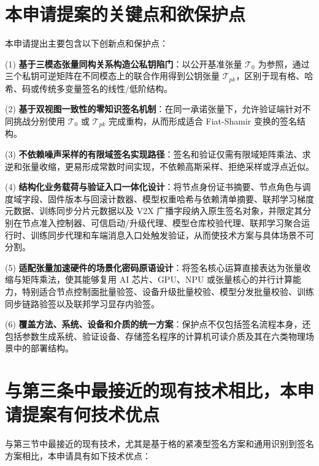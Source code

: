 \documentclass[12pt,a4paper]{article}
\begin{document}
\section{本申请提案的关键点和欲保护点}

本申请提出主要包含以下创新点和保护点：

(1) \textbf{基于三模态张量同构关系构造公私钥陷门}：以公开基准张量 $\mathcal{T}_0$ 为参照，通过三个私钥可逆矩阵在不同模态上的联合作用得到公钥张量 $\mathcal{T}_{pk}$，区别于现有格、哈希、码或传统多变量签名的线性/低阶结构。

(2) \textbf{基于双视图一致性的零知识签名机制}：在同一承诺张量下，允许验证端针对不同挑战分别使用 $\mathcal{T}_0$ 或 $\mathcal{T}_{pk}$ 完成重构，从而形成适合 Fiat-Shamir 变换的签名结构。

(3) \textbf{不依赖噪声采样的有限域签名实现路径}：签名和验证仅需有限域矩阵乘法、求逆和张量收缩，更易形成常数时间实现，不依赖高斯采样、拒绝采样或浮点近似。

(4) \textbf{结构化业务载荷与验证入口一体化设计}：将节点身份证书摘要、节点角色与调度域字段、固件版本与回滚计数器、模型权重哈希与依赖清单摘要、联邦学习梯度元数据、训练同步分片元数据以及 V2X 广播字段纳入原生签名对象，并限定其分别在节点准入控制器、可信启动/升级代理、模型仓库校验代理、联邦学习聚合运行时、训练同步代理和车端消息入口处触发验证，从而使技术方案与具体场景不可分割。

(5) \textbf{适配张量加速硬件的场景化密码原语设计}：将签名核心运算直接表达为张量收缩与矩阵乘法，使其能够复用 AI 芯片、GPU、NPU 或张量核心的并行计算能力，特别适合节点控制面批量验签、设备升级批量校验、模型分发批量校验、训练同步链路验签以及联邦学习显存内验签。

(6) \textbf{覆盖方法、系统、设备和介质的统一方案}：保护点不仅包括签名流程本身，还包括参数生成系统、验证设备、存储签名程序的计算机可读介质及其在六类物理场景中的部署结构。

\section{与第三条中最接近的现有技术相比，本申请提案有何技术优点}

与第三节中最接近的现有技术，尤其是基于格的紧凑型签名方案和通用识别到签名方案相比，本申请具有如下技术优点：
\end{document}
